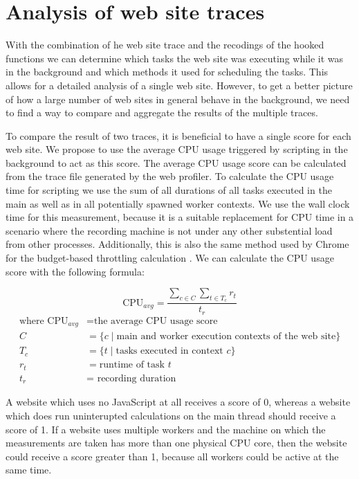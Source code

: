 \documentclass[
	ruledheaders=section,%
	class=report,%
	thesis={type=bachelor},%
	accentcolor=9c,%
	custommargins=true,%
	marginpar=false,%
	parskip=half-,%
	fontsize=11pt,%
]{tudapub}
\begin{document}
  \section{Analysis of web site traces}
  \label{sec:trace-analysis}

  With the combination of he web site trace and the recodings of the hooked functions we can determine which tasks the web site was executing while it was in the background and which methods it used for scheduling the tasks. This allows for a detailed analysis of a single web site. However, to get a better picture of how a large number of web sites in general behave in the background, we need to find a way to compare and aggregate the results of the multiple traces.

  To compare the result of two traces, it is beneficial to have a single score for each web site. We propose to use the average CPU usage triggered by scripting in the background to act as this score. The average CPU usage score can be calculated from the trace file generated by the web profiler. To calculate the CPU usage time for scripting we use the sum of all durations of all tasks executed in the main as well as in all potentially spawned worker contexts. We use the wall clock time for this measurement, because it is a suitable replacement for CPU time in a scenario where the recording machine is not under any other substential load from other processes. Additionally, this is also the same method used by Chrome for the budget-based throttling calculation \cite{chrome-background-tabs}. We can calculate the CPU usage score with the following formula:

  \begin{equation*}
    \text{CPU}_{avg} = \frac{ \sum_{ c \in C } \sum_{ t \in T_c } r_t }{ t_r }
  \end{equation*}
  \begin{align*}
    \text{where CPU}_{avg} &= \text{the average CPU usage score} \\
    C &= \{ c \mid \text{main and worker execution contexts of the web site} \} \\
    T_c &= \{ t \mid \text{tasks executed in context } c \} \\
    r_t &= \text{runtime of task } t \\
    t_r &= \text{ recording duration }
  \end{align*}

  A website which uses no JavaScript at all receives a score of 0, whereas a website which does run uninterupted calculations on the main thread should receive a score of 1. If a website uses multiple workers and the machine on which the measurements are taken has more than one physical CPU core, then the website could receive a score greater than 1, because all workers could be active at the same time.
\end{document}
